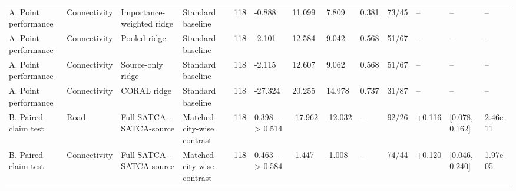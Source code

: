 \begin{table}[t]
{\begin{tabular}{lllllllllllll}
A. Point performance & Connectivity & Importance-weighted ridge & Standard baseline & 118 & -0.888 & 11.099 & 7.809 & 0.381 & 73/45 & -- & -- & -- \\
A. Point performance & Connectivity & Pooled ridge & Standard baseline & 118 & -2.101 & 12.584 & 9.042 & 0.568 & 51/67 & -- & -- & -- \\
A. Point performance & Connectivity & Source-only ridge & Standard baseline & 118 & -2.115 & 12.607 & 9.062 & 0.568 & 51/67 & -- & -- & -- \\
A. Point performance & Connectivity & CORAL ridge & Standard baseline & 118 & -27.324 & 20.255 & 14.978 & 0.737 & 31/87 & -- & -- & -- \\
B. Paired claim test & Road & Full SATCA - SATCA-source & Matched city-wise contrast & 118 & 0.398 -> 0.514 & -17.962 & -12.032 & -- & 92/26 & +0.116 & [0.078, 0.162] & 2.46e-11 \\
B. Paired claim test & Connectivity & Full SATCA - SATCA-source & Matched city-wise contrast & 118 & 0.463 -> 0.584 & -1.447 & -1.008 & -- & 74/44 & +0.120 & [0.046, 0.240] & 1.97e-05 \\
\bottomrule
\end{tabular}
}%
\end{table}
